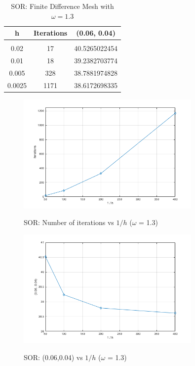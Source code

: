 \documentclass[11pt]{amsart}
\begin{document}
\begin{table}[h!]
    \caption{SOR: Finite Difference Mesh with $\omega =1.3$}
    \label{tbl:fdm_mesh_2}
    \begin{tabular}{ c | c | c}
    	\textbf{h} & \textbf{Iterations} & \textbf{(0.06, 0.04)}\\ \hline \\
	0.02 & 17 & 40.5265022454\\
	0.01 & 18 & 39.2382703774\\
	0.005 & 328 & 38.7881974828\\
	0.0025 & 1171 & 38.6172698335
    \end{tabular}
\end{table}
\begin{center}
	\begin{figure}[h]
		\caption{SOR: Number of iterations vs $1 / h$ ($\omega$ = 1.3)}
		\includegraphics[width=0.8\textwidth]{assets/itr_v_1_o_h.png}\label{fig:itr_vs_1_o_h}
	\end{figure}
\end{center}
\begin{center}
	\begin{figure}[h]
		\caption{SOR: (0.06,0.04) vs $1 / h$ ($\omega$ = 1.3)}
		\includegraphics[width=0.8\textwidth]{assets/point_v_1_o_h.png}\label{fig:point_vs_1_o_h}
	\end{figure}
\end{center}
\end{document}

